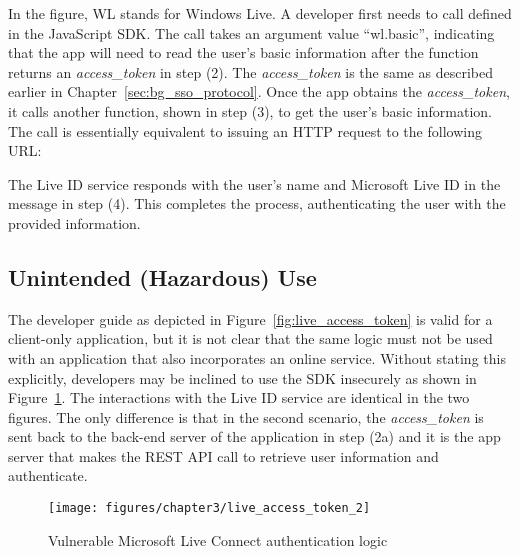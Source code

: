 In the figure, WL stands for Windows Live. A developer first needs to call  defined in the JavaScript SDK. The call takes an argument value ``wl.basic'', indicating that the app will need to read the user's basic information after the function returns an \emph{access\_token} in step (2).  The \emph{access\_token} is the same as described earlier in Chapter~\ref{sec:bg_sso_protocol}.  Once the app obtains the \emph{access\_token}, it calls another function, shown in step (3), to get the user's basic information.  The call is essentially equivalent to issuing an HTTP request to the following URL:

\setlength{\fboxrule}{0pt}

The Live ID service responds with the user's name and Microsoft Live ID in the message in step (4). This completes the process, authenticating the user with the provided information. 

\subsection{Unintended (Hazardous) Use}

The developer guide as depicted in Figure~\ref{fig:live_access_token} is valid for a client-only application, but it is not clear that the same logic must not be used with an application that also incorporates an online service.  Without stating this explicitly, developers may be inclined to use the SDK insecurely as shown in Figure~\ref{fig:live_access_token_2}. The interactions with the Live ID service are identical in the two figures.  The only difference is that in the second scenario, the \emph{access\_token} is sent back to the back-end server of the application in step (2a) and it is the app server that makes the REST API call to retrieve user information and authenticate. 

\begin{figure}[hbt]
\centering
\texttt{[image: figures/chapter3/live\_access\_token\_2]}
\caption{Vulnerable Microsoft Live Connect authentication logic}
\label{fig:live_access_token_2}
\end{figure}

